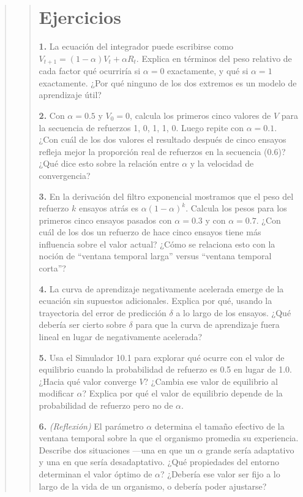 \documentclass[
  letterpaper,
  DIV=11,
  numbers=noendperiod]{scrreprt}
\begin{document}
\begin{tcolorbox}[enhanced jigsaw, arc=.35mm, bottomrule=.15mm, breakable, colback=white, colframe=quarto-callout-note-color-frame, left=2mm, leftrule=.75mm, opacityback=0, rightrule=.15mm, toprule=.15mm]
\begin{quote}
\begin{quote}
\mbox{}%
\section{Ejercicios}\label{ejercicios-2}

\textbf{1.} La ecuación del integrador puede escribirse como
\(V_{t+1} = (1-\alpha)V_t + \alpha R_t\). Explica en términos del peso
relativo de cada factor qué ocurriría si \(\alpha = 0\) exactamente, y
qué si \(\alpha = 1\) exactamente. ¿Por qué ninguno de los dos extremos
es un modelo de aprendizaje útil?

\textbf{2.} Con \(\alpha = 0.5\) y \(V_0 = 0\), calcula los primeros
cinco valores de \(V\) para la secuencia de refuerzos 1, 0, 1, 1, 0.
Luego repite con \(\alpha = 0.1\). ¿Con cuál de los dos valores el
resultado después de cinco ensayos refleja mejor la proporción real de
refuerzos en la secuencia (0.6)? ¿Qué dice esto sobre la relación entre
\(\alpha\) y la velocidad de convergencia?

\textbf{3.} En la derivación del filtro exponencial mostramos que el
peso del refuerzo \(k\) ensayos atrás es \(\alpha(1-\alpha)^k\). Calcula
los pesos para los primeros cinco ensayos pasados con \(\alpha = 0.3\) y
con \(\alpha = 0.7\). ¿Con cuál de los dos un refuerzo de hace cinco
ensayos tiene más influencia sobre el valor actual? ¿Cómo se relaciona
esto con la noción de ``ventana temporal larga'' versus ``ventana
temporal corta''?

\textbf{4.} La curva de aprendizaje negativamente acelerada emerge de la
ecuación sin supuestos adicionales. Explica por qué, usando la
trayectoria del error de predicción \(\delta\) a lo largo de los
ensayos. ¿Qué debería ser cierto sobre \(\delta\) para que la curva de
aprendizaje fuera lineal en lugar de negativamente acelerada?

\textbf{5.} Usa el Simulador 10.1 para explorar qué ocurre con el valor
de equilibrio cuando la probabilidad de refuerzo es 0.5 en lugar de 1.0.
¿Hacia qué valor converge \(V\)? ¿Cambia ese valor de equilibrio al
modificar \(\alpha\)? Explica por qué el valor de equilibrio depende de
la probabilidad de refuerzo pero no de \(\alpha\).

\textbf{6.} \emph{(Reflexión)} El parámetro \(\alpha\) determina el
tamaño efectivo de la ventana temporal sobre la que el organismo
promedia su experiencia. Describe dos situaciones ---una en que un
\(\alpha\) grande sería adaptativo y una en que sería desadaptativo.
¿Qué propiedades del entorno determinan el valor óptimo de \(\alpha\)?
¿Debería ese valor ser fijo a lo largo de la vida de un organismo, o
debería poder ajustarse?


\end{quote}
\end{quote}
\end{tcolorbox}
\end{document}
